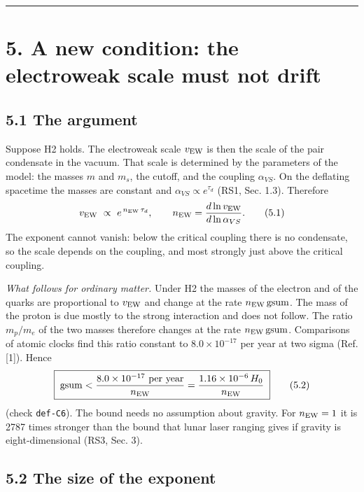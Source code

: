 \documentclass[
  10pt,
]{article}
\begin{document}
\begin{center}\rule{0.5\linewidth}{0.5pt}\end{center}

\hypertarget{a-new-condition-the-electroweak-scale-must-not-drift}{%
\section{5. A new condition: the electroweak scale must not
drift}\label{a-new-condition-the-electroweak-scale-must-not-drift}}

\hypertarget{the-argument}{%
\subsection{5.1 The argument}\label{the-argument}}

Suppose H2 holds. The electroweak scale \(v_{\rm EW}\) is then the scale
of the pair condensate in the vacuum. That scale is determined by the
parameters of the model: the masses \(m\) and \(m_s\), the cutoff, and
the coupling \(\alpha_{VS}\). On the deflating spacetime the masses are
constant and \(\alpha_{VS}\propto e^{\tau_d}\) (RS1, Sec. 1.3).
Therefore
\[v_{\rm EW}\ \propto\ e^{\,n_{\rm EW}\,\tau_d},\qquad n_{\rm EW}=\frac{d\ln v_{\rm EW}}{d\ln\alpha_{VS}} .\tag{5.1}\]
The exponent cannot vanish: below the critical coupling there is no
condensate, so the scale depends on the coupling, and most strongly just
above the critical coupling.

\emph{What follows for ordinary matter.} Under H2 the masses of the
electron and of the quarks are proportional to \(v_{\rm EW}\) and change
at the rate \(n_{\rm EW}\,\mathrm{gsum}\). The mass of the proton is due
mostly to the strong interaction and does not follow. The ratio
\(m_p/m_e\) of the two masses therefore changes at the rate
\(n_{\rm EW}\,\mathrm{gsum}\). Comparisons of atomic clocks find this
ratio constant to \(8.0\times10^{-17}\) per year at two sigma (Ref.
{[}1{]}). Hence
\[\boxed{\;\mathrm{gsum}<\frac{8.0\times10^{-17}\ \text{per year}}{n_{\rm EW}}=\frac{1.16\times10^{-6}\,H_0}{n_{\rm EW}}\;}\tag{5.2}\]
(check \texttt{def-C6}). The bound needs no assumption about gravity.
For \(n_{\rm EW}=1\) it is 2787 times stronger than the bound that lunar
laser ranging gives if gravity is eight-dimensional (RS3, Sec. 3).

\hypertarget{the-size-of-the-exponent}{%
\subsection{5.2 The size of the
exponent}\label{the-size-of-the-exponent}}
\end{document}

